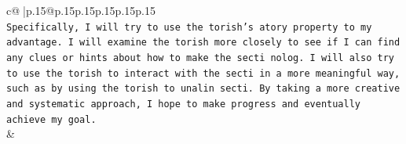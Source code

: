 \documentclass{article}
\begin{document}
{\begin{supertabular}{c@{$\;$}|p{.15\linewidth}@{}p{.15\linewidth}p{.15\linewidth}p{.15\linewidth}p{.15\linewidth}p{.15\linewidth}}
{{{\\ 
\texttt{Specifically, I will try to use the torish's atory property to my advantage. I will examine the torish more closely to see if I can find any clues or hints about how to make the secti nolog. I will also try to use the torish to interact with the secti in a more meaningful way, such as by using the torish to unalin secti. By taking a more creative and systematic approach, I hope to make progress and eventually achieve my goal.} \\
            }
        }
    }
    & \\ \\

\end{supertabular}
}
\end{document}
